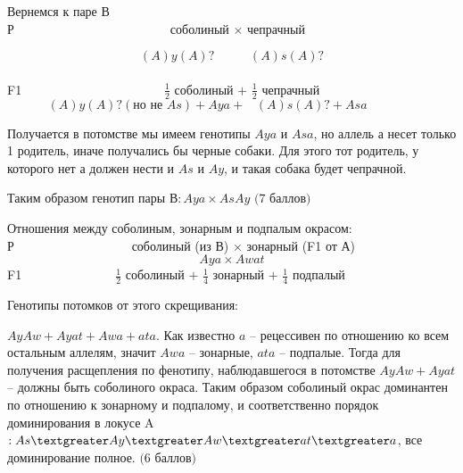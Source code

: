 Вернемся к паре В\\
Р$\hspace{150pt}$соболиный $\times$ чепрачный

$$(A)y(A)?\hspace{34pt}(A)s(A)?$$\\
F1$\hspace{137pt}\frac{1}{2}$ соболиный $+$ $\frac{1}{2}$ чепрачный \\
$$(A)y(A)?(\text{но не }As)+Aya+\hspace{10pt}(A)s(A)?+Asa\hspace{47pt}$$

Получается в потомстве мы имеем генотипы $Aya$ и $Asa$, но аллель а несет только 1 родитель, иначе получались бы черные собаки. Для этого тот родитель, у которого нет а должен нести и $As$ и $Ay$, и такая собака будет чепрачной.

Таким образом генотип пары В$:Aya\times AsAy$ $\textit{(7 баллов)}$

Отношения между соболиным, зонарным и подпалым окрасом:\\
Р$\hspace{113pt}$соболиный (из В) $\times$ зонарный (F1 от А)
$$Aya\times Awat$$
F1$\hspace{90pt}\frac{1}{2}$ соболиный $+$ $\frac{1}{4}$ зонарный $+$ $\frac{1}{4}$ подпалый

Генотипы потомков от этого скрещивания:

$AyAw+Ayat+Awa+ata$. Как известно $a$ – рецессивен по отношению ко всем остальным аллелям, значит $Awa$ – зонарные, $ata$ – подпалые. Тогда для получения расщепления по фенотипу, наблюдавшегося в потомстве $AyAw+Ayat$ – должны быть соболиного окраса. Таким образом соболиный окрас доминантен по отношению к зонарному и подпалому, и соответственно порядок доминирования в локусе A$:As\textgreater Ay\textgreater Aw\textgreater at\textgreater a$, все доминирование полное. $\textit{(6 баллов)}$

